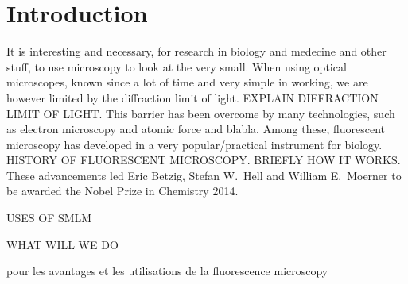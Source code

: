 \section{Introduction}
It is interesting and necessary, for research in biology and medecine and other stuff, to use microscopy to look at the very small.
When using optical microscopes, known since a lot of time and very simple in working, we are however limited by the diffraction limit of light.
EXPLAIN DIFFRACTION LIMIT OF LIGHT.
This barrier has been overcome by many technologies, such as electron microscopy and atomic force and blabla.
Among these, fluorescent microscopy has developed in a very popular/practical instrument for biology.
HISTORY OF FLUORESCENT MICROSCOPY.
BRIEFLY HOW IT WORKS.
These advancements led Eric Betzig, Stefan W.~Hell and William E.~Moerner to be awarded the Nobel Prize in Chemistry 2014.

USES OF SMLM

WHAT WILL WE DO

\cite{sachl_introduction_2022} pour les avantages et les utilisations de la fluorescence microscopy
